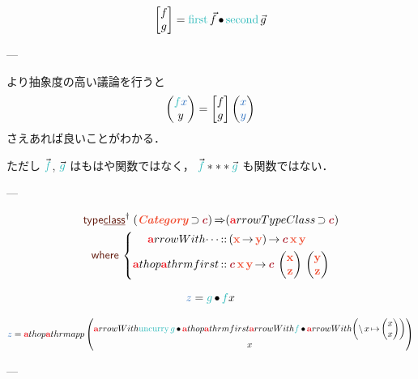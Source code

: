 \documentclass[a5paper,twoside,fleqn,draft]{jsbook}
\begin{document}
\begin{equation}
  \begin{bmatrix}
    f\\g
  \end{bmatrix}
  =\mFirst\Vec{f}\mCompCat\mSecond\Vec{g}
\end{equation}

---

より抽象度の高い議論を行うと
\begin{equation}
  \hPairWith{\hFunc{f}\hVar{x}}{y}
  =\begin{bmatrix}f\\g\end{bmatrix}
  \hPairWith{\hVar{x}}{\hVar{y}}
\end{equation}
さえあれば良いことがわかる．


ただし $\Vec{\hFunc{f}}$, $\Vec{\hFunc{g}}$ はもはや関数ではなく，
$\Vec{\hFunc{f}}***\Vec{\hFunc{g}}$ も関数ではない．

---

\newcommand{\mFirstFunc}{\hTypeName{a}thop{\hTypeName{a}thrm{first}}}

\begin{multline}
  \mTypeClassDeclPolymorphic\;
  (\mCatTypeClass\hHasElementsOf\mTypeConstructor{c})
  \hAndThen(\hTypeName{a}rrowTypeClass\hHasElementsOf\mTypeConstructor{c})\\
  \mWhere{}\left\{
  \begin{aligned}
    \hTypeName{a}rrowWith{\dotsb}
    &\hIsTypeOf{}(\mX\hFunctionArrow\mY)\hFunctionArrow\mTypeConstructor{c}\,\mX\,\mY\\
    \mFirstFunc
    &\hIsTypeOf{}\mTypeConstructor{c}\,\mX\,\mY
    \hFunctionArrow\mTypeConstructor{c}\,\hPairWith{\mX}{\mZ}\,\hPairWith{\mY}{\mZ}
  \end{aligned}
  \right.
\end{multline}

\begin{equation}
  \hVar{z}=\hFunc{g}\hCompose \hFunc{f} x
\end{equation}

\begin{equation}
  \hVar{z}=\hTypeName{a}thop{\hTypeName{a}thrm{app}}\hPairWith{\hTypeName{a}rrowWith{\hUncurry \hFunc{g}}\mCompCat\mFirstFunc\hTypeName{a}rrowWith{\hFunc{f}}\mCompCat{}\hTypeName{a}rrowWith{\left(\mLambda x\mLambdaArrow\hPairWith{x}{x}\right)}}{x}
\end{equation}

---
\end{document}
